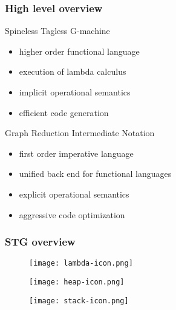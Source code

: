 \documentclass[bigger]{beamer}
\begin{document}
\begin{frame}[fragile]
\frametitle{High level overview}

\begin{minipage}{0.4\textwidth}
	\begin{center}
		Spineless Tagless G-machine
	\end{center}
	\begin{itemize}
		\item<2-> higher order functional language
		\item<3-> execution of lambda calculus
		\item<4-> implicit operational semantics
		\item<5-> efficient code generation
	\end{itemize}
\end{minipage}
\hfill
\begin{minipage}{0.4\textwidth}
	\begin{center}
		Graph Reduction Intermediate Notation
	\end{center}
	\begin{itemize}
		\item<6-> first order imperative language
		\item<7-> unified back end for functional languages
		\item<8-> explicit operational semantics
		\item<9-> aggressive code optimization 
	\end{itemize}
\end{minipage}

\end{frame}


\begin{frame}[fragile]
\frametitle{STG overview}
\begin{center}

	\begin{minipage}{0.25\textwidth}
		\begin{figure}
			\texttt{[image: lambda-icon.png]}
		\end{figure}
	\end{minipage}
	\hfill
	\pause
	\begin{minipage}{0.30\textwidth}
		\begin{figure}
			\texttt{[image: heap-icon.png]}
		\end{figure}
	\end{minipage}
	\hfill
	\pause
	\begin{minipage}{0.30\textwidth}
		\begin{figure}
			\texttt{[image: stack-icon.png]}
		\end{figure}
	\end{minipage}

\end{center}
\end{frame}
\end{document}
